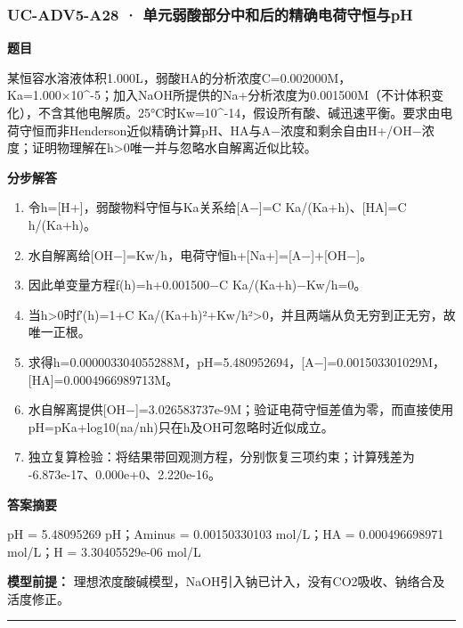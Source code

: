 \documentclass[UTF8,11pt,a4paper]{ctexart}
\begin{document}
\subsubsection*{UC-ADV5-A28 · 单元弱酸部分中和后的精确电荷守恒与pH}
\noindent\textbf{题目}\par
某恒容水溶液体积1.000L，弱酸HA的分析浓度C=0.002000M，Ka=1.000×10\textasciicircum{}-5；加入NaOH所提供的Na+分析浓度为0.001500M（不计体积变化），不含其他电解质。25°C时Kw=10\textasciicircum{}-14，假设所有酸、碱迅速平衡。要求由电荷守恒而非Henderson近似精确计算pH、HA与A−浓度和剩余自由H+/OH−浓度；证明物理解在h>0唯一并与忽略水自解离近似比较。\par
\medskip\noindent\textbf{分步解答}
\begin{enumerate}
\item 令h=[H+]，弱酸物料守恒与Ka关系给[A−]=C Ka/(Ka+h)、[HA]=C h/(Ka+h)。
\item 水自解离给[OH−]=Kw/h，电荷守恒h+[Na+]=[A−]+[OH−]。
\item 因此单变量方程f(h)=h+0.001500−C Ka/(Ka+h)−Kw/h=0。
\item 当h>0时f′(h)=1+C Ka/(Ka+h)²+Kw/h²>0，并且两端从负无穷到正无穷，故唯一正根。
\item 求得h=0.000003304055288M，pH=5.480952694，[A−]=0.001503301029M，[HA]=0.0004966989713M。
\item 水自解离提供[OH−]=3.026583737e-9M；验证电荷守恒差值为零，而直接使用pH=pKa+log10(na/nh)只在h及OH可忽略时近似成立。
\item 独立复算检验：将结果带回观测方程，分别恢复三项约束；计算残差为 -6.873e-17、0.000e+0、2.220e-16。
\end{enumerate}
\noindent\textbf{答案摘要}\par
pH = 5.48095269 pH；Aminus = 0.00150330103 mol/L；HA = 0.000496698971 mol/L；H = 3.30405529e-06 mol/L\par
\noindent\textbf{模型前提：}
理想浓度酸碱模型，NaOH引入钠已计入，没有CO2吸收、钠络合及活度修正。\par
\medskip\hrule\medskip
{}
\end{document}
